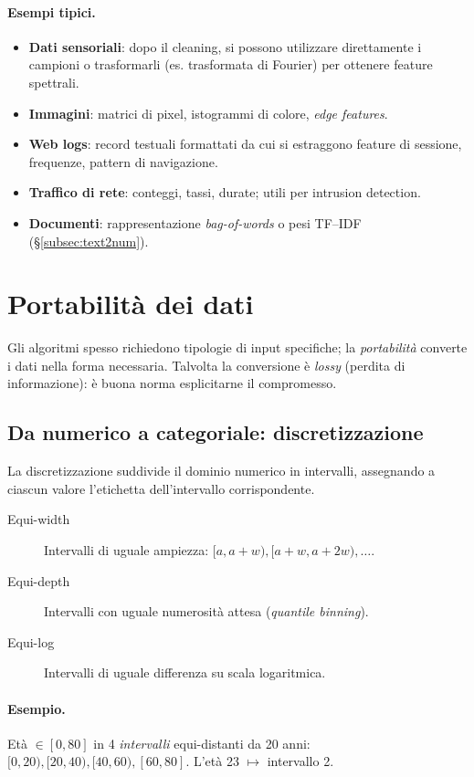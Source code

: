 \paragraph{Esempi tipici.}
\begin{itemize}
  \item \textbf{Dati sensoriali}: dopo il cleaning, si possono utilizzare direttamente i campioni o trasformarli (es. trasformata di Fourier) per ottenere feature spettrali.
  \item \textbf{Immagini}: matrici di pixel, istogrammi di colore, \emph{edge features}.
  \item \textbf{Web logs}: record testuali formattati da cui si estraggono feature di sessione, frequenze, pattern di navigazione.
  \item \textbf{Traffico di rete}: conteggi, tassi, durate; utili per intrusion detection.
  \item \textbf{Documenti}: rappresentazione \emph{bag-of-words} o pesi TF--IDF (\S\ref{subsec:text2num}).
\end{itemize}

\section{Portabilità dei dati}\label{sec:portabilita}
Gli algoritmi spesso richiedono tipologie di input specifiche; la \emph{portabilità} converte i dati nella forma necessaria. Talvolta la conversione è \emph{lossy} (perdita di informazione): è buona norma esplicitarne il compromesso.

\subsection{Da numerico a categoriale: discretizzazione}\label{subsec:discret}
La discretizzazione suddivide il dominio numerico in intervalli, assegnando a ciascun valore l'etichetta dell'intervallo corrispondente.
\begin{description}
  \item[Equi-width] Intervalli di uguale ampiezza: $[a, a+w), [a+w, a+2w), \ldots$.
  \item[Equi-depth] Intervalli con uguale numerosità attesa (\emph{quantile binning}).
  \item[Equi-log] Intervalli di uguale differenza su scala logaritmica.
\end{description}
\paragraph{Esempio.} Età $\in[0,80]$ in 4 \emph{intervalli} equi-distanti da 20 anni: $[0,20),[20,40),[40,60),[60,80]$. L'età 23 $\mapsto$ intervallo 2.

